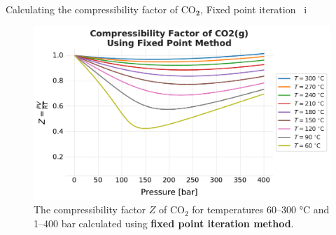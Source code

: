 \begin{frame}{Calculating the compressibility factor of CO$_{\boldsymbol{2}}$, Fixed point iteration \, i}

\begin{figure}
\begin{centering}
\includegraphics[height=0.8\textheight]{figures/activity-models/co2-compressibility-factor-fixed-point}
\par\end{centering}
\caption{The compressibility factor $Z$ of CO$_{2}$ for temperatures
60–300 °C and 1–400 bar calculated using \textbf{fixed point iteration method}. }
\end{figure}

\end{frame}
%
%
